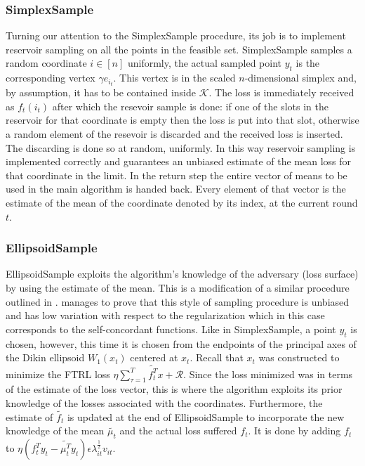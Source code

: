 \subsubsection{SimplexSample}
Turning our attention to the SimplexSample procedure, its job is to implement reservoir sampling on all the points in the feasible set. SimplexSample samples a random coordinate $i \in [n]$ uniformly, the actual sampled point $y_t$ is the corresponding vertex $\gamma e_{i_t}$. This vertex is in the scaled $n$-dimensional simplex and, by assumption, it has to be contained inside $\mathcal{K}$. The loss is immediately received as $f_t(i_t)$ after which the resevoir sample is done: if one of the slots in the reservoir for that coordinate is empty then the loss is put into that slot, otherwise a random element of the resevoir is discarded and the received loss is inserted. The discarding  is done so at random, uniformly. In this way reservoir sampling is implemented correctly and guarantees an unbiased estimate of the mean loss for that coordinate in the limit. In the return step the entire vector of means to be used in the main algorithm is handed back. Every element of that vector is the estimate of the mean of the coordinate denoted by its index, at the current round $t$.
 
\subsubsection{EllipsoidSample}
EllipsoidSample exploits the algorithm's knowledge of the adversary (loss surface) by using the estimate of the mean. This is a modification of a similar procedure outlined in \citep{abernethy}. \citep{abernethy} manages to prove that this style of sampling procedure is unbiased and has low variation with respect to the regularization which in this case corresponds to the self-concordant functions. Like in SimplexSample, a point $y_t$ is chosen, however, this time it is chosen from the endpoints of the principal axes of the Dikin ellipsoid $W_1(x_t)$ centered at $x_t$. Recall that $x_t$ was constructed to minimize the FTRL loss $\eta \sum_{\tau=1}^T\tilde{f_t^T}x +\mathcal{R}$. Since the loss minimized was in terms of the estimate of the loss vector, this is where the algorithm exploits its prior knowledge of the losses associated with the coordinates. Furthermore, the estimate of $\tilde{f_t}$ is updated at the end of EllipsoidSample to incorporate the new knowledge of the mean $\tilde{\mu_t}$ and the actual loss suffered $f_t$. It is done by adding $f_t$ to $\eta (f_{t}^Ty_t - \tilde{\mu_{t}^T}y_t)\epsilon \lambda_{it}^{\frac{1}{2}}v_{it}$.

